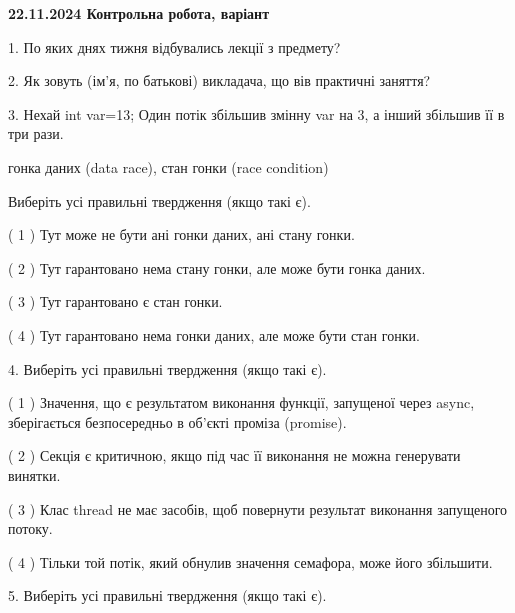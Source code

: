 \documentclass[12pt, ukrainian]{article}
\begin{document}
\vspace{4mm}
\newpage
\begin {large}

\textbf{22.11.2024 Контрольна робота, варіант  }\par


{
1. По яких днях тижня відбувались лекції з предмету?



\vspace{5mm}
2. Як зовуть (ім'я, по батькові) викладача, що вів практичні заняття?



\vspace{5mm}
3. Нехай int var=13; Один потік збільшив змінну var на 3, а інший збільшив її в три рази.

гонка даних (data race), стан гонки (race condition)

Виберіть усі правильні твердження (якщо такі є).\par
\vspace{2mm}
( 1 ) Тут може не бути ані гонки даних, ані стану гонки.%

( 2 ) Тут гарантовано нема стану гонки, але може бути гонка даних.%

( 3 ) Тут гарантовано є стан гонки.%

( 4 ) Тут гарантовано нема гонки даних, але може бути стан гонки.%


\vspace{5mm}
4. Виберіть усі правильні твердження (якщо такі є).\par
\vspace{2mm}

( 1 ) Значення, що є результатом виконання функції, запущеної через async, зберігається безпосередньо в об’єкті проміза (promise).%

( 2 ) Секція є критичною, якщо під час її виконання не можна генерувати винятки.%

( 3 ) Клас thread не має засобів, щоб повернути результат виконання запущеного потоку.%

( 4 ) Тільки той потік, який обнулив значення семафора, може його збільшити.%


\vspace{5mm}
5. Виберіть усі правильні твердження (якщо такі є).\par
\vspace{2mm}

}
\end{large}
\end{document}
